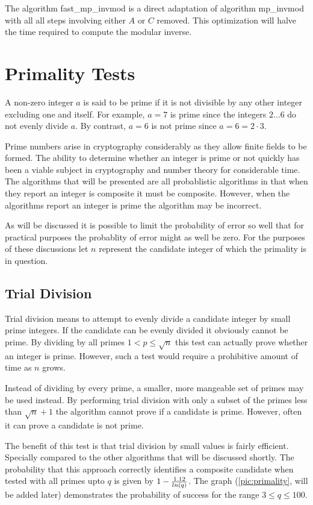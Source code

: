 \documentclass[b5paper]{book}
\begin{document}
The algorithm fast\_mp\_invmod is a direct adaptation of algorithm mp\_invmod with all all steps involving either $A$ or $C$ removed.  This 
optimization will halve the time required to compute the modular inverse.

\section{Primality Tests}

A non-zero integer $a$ is said to be prime if it is not divisible by any other integer excluding one and itself.  For example, $a = 7$ is prime 
since the integers $2 \ldots 6$ do not evenly divide $a$.  By contrast, $a = 6$ is not prime since $a = 6 = 2 \cdot 3$. 

Prime numbers arise in cryptography considerably as they allow finite fields to be formed.  The ability to determine whether an integer is prime or
not quickly has been a viable subject in cryptography and number theory for considerable time.  The algorithms that will be presented are all
probablistic algorithms in that when they report an integer is composite it must be composite.  However, when the algorithms report an integer is
prime the algorithm may be incorrect.  

As will be discussed it is possible to limit the probability of error so well that for practical purposes the probablity of error might as 
well be zero.  For the purposes of these discussions let $n$ represent the candidate integer of which the primality is in question.

\subsection{Trial Division}

Trial division means to attempt to evenly divide a candidate integer by small prime integers.  If the candidate can be evenly divided it obviously
cannot be prime.  By dividing by all primes $1 < p \le \sqrt{n}$ this test can actually prove whether an integer is prime.  However, such a test
would require a prohibitive amount of time as $n$ grows.

Instead of dividing by every prime, a smaller, more mangeable set of primes may be used instead.  By performing trial division with only a subset
of the primes less than $\sqrt{n} + 1$ the algorithm cannot prove if a candidate is prime.  However, often it can prove a candidate is not prime.

The benefit of this test is that trial division by small values is fairly efficient.  Specially compared to the other algorithms that will be
discussed shortly.  The probability that this approach correctly identifies a composite candidate when tested with all primes upto $q$ is given by
$1 - {1.12 \over ln(q)}$.  The graph (\ref{pic:primality}, will be added later) demonstrates the probability of success for the range 
$3 \le q \le 100$.  
\end{document}
